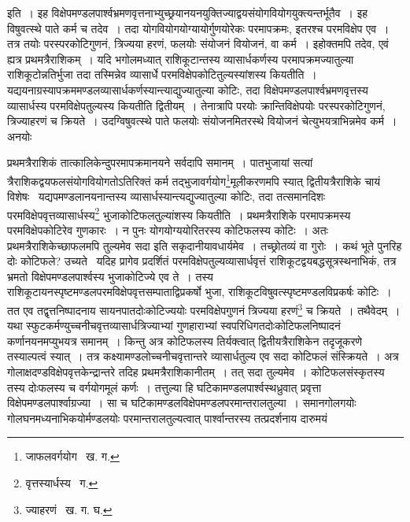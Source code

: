 \documentclass[11pt, openany]{book}
\begin{document}
\begin{sloppypar} 
\noindent इति~। इह विक्षेपमण्डलपार्श्वभ्रमणवृत्तनाभ्युच्छ्रयानयनयुक्तिज्याद्वयसंयोगवियोगयुक्त्यन्तर्भूतैव~। इह विषुवत्स्थे पाते कर्म च तदेव~। तदा योगवियोगयोग्यायोर्गुणयोरेकः परमापक्रमः, इतरश्च परमविक्षेप एव~। तत्र तयोः परस्परकोटिगुणनं, त्रिज्यया हरणं, फलयोः संयोजनं वियोजनं, वा कर्म~। इहोक्तमपि तदेव, एवं ह्यत्र प्रथमत्रैराशिकम्~। यदि भगोलमध्यात् राशिकूटान्तस्य व्यासार्धकर्णस्य परमापक्रमज्यातुल्या राशिकूटोन्नतिर्भुजा तदा तस्मिन्नेव व्यासार्धे परमविक्षेपकोटितुल्यस्यांशस्य कियतीति~। यद्ययनाग्रस्यापक्रममण्डलव्यासार्धकर्णस्यान्त्याद्युज्यातुल्या कोटिः, तदा विक्षेपमण्डलपार्श्वभ्रमणवृत्तस्य व्यासार्धस्य परमविक्षेपतुल्यस्य कियतीति द्वितीयम्~। तेनात्रापि परयोः क्रान्तिविक्षेपयोः परस्परकोटिगुणनं, त्रिज्याहरणं च क्रियते~। उदग्विषुवत्स्थे पाते
फलयोः संयोजनमितरस्थे वियोजनं चेत्युभयत्राभिन्नमेव कर्म~। अनयोः
\end{sloppypar} 
\newpage

\begin{sloppypar} 
\noindent प्रथमत्रैराशिकं तात्कालिकेन्दुपरमापक्रमानयने सर्वदापि समानम्~। पातभुजायां सत्यां त्रैराशिकद्वयफलसंयोगवियोगतोऽतिरिक्तं कर्म तद्भुजावर्गयोग\renewcommand{\thefootnote}{१}\footnote{जाफलवर्गयोग \textendash\ ख. ग.}मूलीकरणमपि स्यात् द्वितीयत्रैराशिके चायं विशेषः \textendash\ यद्यपमण्डलानयनान्तस्य व्यासार्धस्यान्त्यद्युज्यातुल्या कोटिः, तदा तत्समानदिशः परमविक्षेपवृत्तव्यासार्धस्य\renewcommand{\thefootnote}{२}\footnote{वृत्तस्यार्धस्य \textendash\ ग.} भुजाकोटिफलतुल्यांशस्य कियतीति~। प्रथमत्रैराशिके परमापक्रमस्य परमविक्षेपकोटिरेव गुणकारः~। न पुनः योगयोग्ययोरितरस्य कोटिफलस्य कोटिः~। अतः प्रथमत्रैराशिकेच्छाफलमपि तुल्यमेव सदा इति सकृदानीयावधार्यमेव~। तच्छ्रोतव्यं वा गुरोः~। कथं भूते पुनरिह दोः कोटिफले? उच्यते \textendash\ यदिह प्रागेव प्रदर्शितं परमविक्षेपतुल्यव्यासार्धवृत्तं राशिकूटद्वयबद्धसूत्रस्थनाभिकं, तत्र भ्रमतो विक्षेपमण्डलपार्श्वस्य भुजाकोटिज्ये एव ते~। तस्य राशिकूटायनस्पृष्टमण्डलपरमविक्षेपवृत्तसम्पाताद्विप्रकर्षो भुजा, राशिकूटविषुवत्स्पृष्टमण्डलविप्रकर्षः कोटिः~। तत एव तद्वृत्तनिष्पादनाय सायनपातदोःकोटिज्ययोः परमविक्षेपगुणनं त्रिज्यया हरणं\renewcommand{\thefootnote}{३}\footnote{ज्याहरणं \textendash\ ख. ग. घ.} च क्रियते~। तथैवेदम्~। यथा स्फुटकर्मण्युच्चनीचवृत्तव्यासार्धत्रिज्याभ्यां गुणहाराभ्यां स्वपरिधिगतदोःकोटिफलनिष्पादनं कर्णानयनमप्युभयत्र समानम्~। किन्तु अत्र कोटिफलस्य तिर्यक्त्वात् द्वितीयत्रैराशिकेन तदृजूकरणे तस्याल्पत्वं स्यात्~। तत्र कक्ष्यामण्डलोच्चनीचवृत्तान्तरे व्यासार्धतुल्य एव सदा कोटिफलं संस्क्रियते~। अत्र गोलाक्षदण्डविक्षेपवृत्तकेन्द्रान्तरे तदिह प्रथमत्रैराशिकानीतम्~। तत् सदा तुल्यमेव~। कोटिफलसंस्कृतस्य तस्य दोःफलस्य च वर्गयोगमूलं कर्णः~। तत्तुल्या हि घटिकामण्डलपार्श्वस्थध्रुवात् प्रवृत्ता विक्षेपमण्डलपार्श्वाग्रज्या~। सा च
घटिकामण्डलविक्षेपमण्डलपरमान्तरालतुल्या~। समानगोलगयोः गोलघनमध्यनाभिकयोर्मण्डलयोः परमान्तरालतुल्यत्वात् पार्श्वान्तरस्य तत्प्रदर्शनाय दारुमयं 
\end{sloppypar}
\newpage
\end{document}
